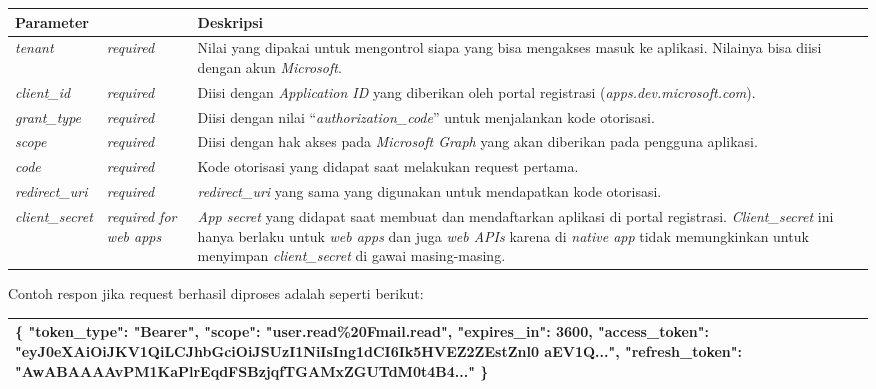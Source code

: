 \begin{description}
\begin{center}
	\begin{tabular}{|p{3cm}|p{2cm}|p{10cm}|}
		\hline
		\textbf{Parameter}& &\textbf{Deskripsi}\\ \hline
		\textit{tenant} & \textit{required} & Nilai yang dipakai untuk mengontrol siapa yang bisa mengakses masuk ke aplikasi. Nilainya bisa diisi dengan akun \textit{Microsoft}. \\ \hline
		 \textit{client\_id} & \textit{required} & Diisi dengan \textit{Application ID} yang diberikan oleh portal registrasi (\textit{apps.dev.microsoft.com}).\\ \hline
		 \textit{grant\_type} & \textit{required} & Diisi dengan nilai ``\textit{authorization\_code}'' untuk menjalankan kode otorisasi.\\ \hline
		 \textit{scope} & \textit{required} & Diisi dengan hak akses pada \textit{Microsoft Graph} yang akan diberikan pada pengguna aplikasi. \\ \hline
		 \textit{code} & \textit{required} & Kode otorisasi yang didapat saat melakukan request pertama.\\ \hline 
		 \textit{redirect\_uri} & \textit{required} & \textit{redirect\_uri} yang sama yang digunakan untuk mendapatkan kode otorisasi. \\ \hline
		 \textit{client\_secret} & \textit{required for web apps} & \textit{App secret} yang didapat saat membuat dan mendaftarkan aplikasi di portal registrasi. \textit{Client\_secret} ini hanya berlaku untuk \textit{web apps} dan juga \textit{web APIs} karena di \textit{native app} tidak memungkinkan untuk menyimpan \textit{client\_secret} di gawai masing-masing. \\ \hline
	\end{tabular}
\end{center}

Contoh respon jika request berhasil diproses adalah seperti berikut:
\begin{center}
	\begin{tabular}{|p{15cm}|}
		\hline
		\{\newline
    	"token\_type": "Bearer",\newline
    	"scope": "user.read\%20Fmail.read",\newline
    	"expires\_in": 3600,\newline
    	"access\_token": "eyJ0eXAiOiJKV1QiLCJhbGciOiJSUzI1NiIsIng1dCI6Ik5HVEZ2ZEstZnl0\newline
    	aEV1Q...",\newline
    	"refresh\_token": "AwABAAAAvPM1KaPlrEqdFSBzjqfTGAMxZGUTdM0t4B4..."\newline
		\}\\ \hline
	\end{tabular}
\end{center} 


\end{description}
